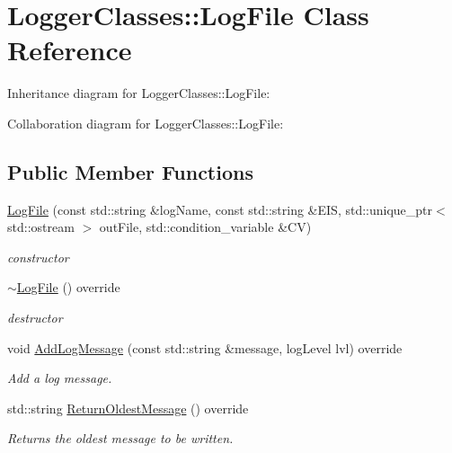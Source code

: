 \hypertarget{classLoggerClasses_1_1LogFile}{}\section{Logger\+Classes\+::Log\+File Class Reference}
\label{classLoggerClasses_1_1LogFile}


Inheritance diagram for Logger\+Classes\+::Log\+File\+:


Collaboration diagram for Logger\+Classes\+::Log\+File\+:
\subsection*{Public Member Functions}
\begin{DoxyCompactItemize}
\item 
\mbox{\hyperlink{classLoggerClasses_1_1LogFile_a669d00eff169258e9805677ebee8d539}{Log\+File}} (const std\+::string \&log\+Name, const std\+::string \&E\+IS, std\+::unique\+\_\+ptr$<$ std\+::ostream $>$ out\+File, std\+::condition\+\_\+variable \&CV)
\begin{DoxyCompactList}\small\item\em constructor \end{DoxyCompactList}\item 
\mbox{\label{classLoggerClasses_1_1LogFile_a0b06f605a2f7e9fe61515a1c8e0ec246}} 
\mbox{\hyperlink{classLoggerClasses_1_1LogFile_a0b06f605a2f7e9fe61515a1c8e0ec246}{$\sim$\+Log\+File}} () override
\begin{DoxyCompactList}\small\item\em destructor \end{DoxyCompactList}\item 
void \mbox{\hyperlink{classLoggerClasses_1_1LogFile_aa9241471ffd75bfbf5d98dd536128479}{Add\+Log\+Message}} (const std\+::string \&message, log\+Level lvl) override
\begin{DoxyCompactList}\small\item\em Add a log message. \end{DoxyCompactList}\item 
std\+::string \mbox{\hyperlink{classLoggerClasses_1_1LogFile_a85d4c992c40d275a33901980424c341b}{Return\+Oldest\+Message}} () override
\begin{DoxyCompactList}\small\item\em Returns the oldest message to be written. \end{DoxyCompactList}\item 

\end{DoxyCompactItemize}
